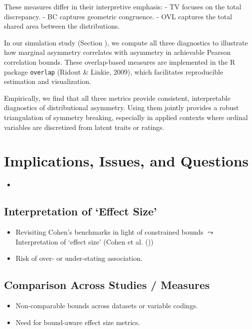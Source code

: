 \documentclass[
  12pt,
]{article}
\providecommand{\tightlist}{%
  \setlength{\itemsep}{0pt}\setlength{\parskip}{0pt}}
\theoremstyle{plain}
\theoremstyle{definition}
\theoremstyle{remark}
\begin{document}
These measures differ in their interpretive emphasis: - TV focuses on
the total discrepancy. - BC captures geometric congruence. - OVL
captures the total shared area between the distributions.

In our simulation study (Section ), we compute all three diagnostics to
illustrate how marginal asymmetry correlates with asymmetry in
achievable Pearson correlation bounds. These overlap-based measures are
implemented in the R package \texttt{overlap} (Ridout \& Linkie, 2009),
which facilitates reproducible estimation and visualization.

Empirically, we find that all three metrics provide consistent,
interpretable diagnostics of distributional asymmetry. Using them
jointly provides a robust triangulation of symmetry breaking, especially
in applied contexts where ordinal variables are discretized from latent
traits or ratings.

\section{Implications, Issues, and
Questions}\label{implications-issues-and-questions}

\begin{itemize}
\tightlist
\item
\end{itemize}

\subsection{Interpretation of `Effect
Size'}\label{interpretation-of-effect-size}

\begin{itemize}
\tightlist
\item
  Revisiting Cohen's benchmarks in light of constrained bounds
  \(\leadsto\) Interpretation of `effect size' (Cohen et al.
  ())
\item
  Risk of over- or under-stating association.
\end{itemize}

\subsection{Comparison Across Studies /
Measures}\label{comparison-across-studies-measures}

\begin{itemize}
\tightlist
\item
  Non-comparable bounds across datasets or variable codings.
\item
  Need for bound-aware effect size metrics.
\end{itemize}
\end{document}
